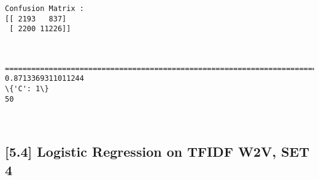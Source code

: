 \documentclass[11pt]{article}
\begin{document}
    \begin{Verbatim}[commandchars=\\\{\}]
Confusion Matrix : 
[[ 2193   837]
 [ 2200 11226]]

    \end{Verbatim}

    \begin{center}
    \end{center}
    { \hspace*{\fill} \\}
    
    \begin{Verbatim}[commandchars=\\\{\}]
====================================================================================================
0.8713369311011244
\{'C': 1\}
50

    \end{Verbatim}

    \begin{center}
    \end{center}
    { \hspace*{\fill} \\}
    
    \subsection{{[}5.4{]} Logistic Regression on TFIDF W2V, SET
4}\label{logistic-regression-on-tfidf-w2v-set-4}
\end{document}
